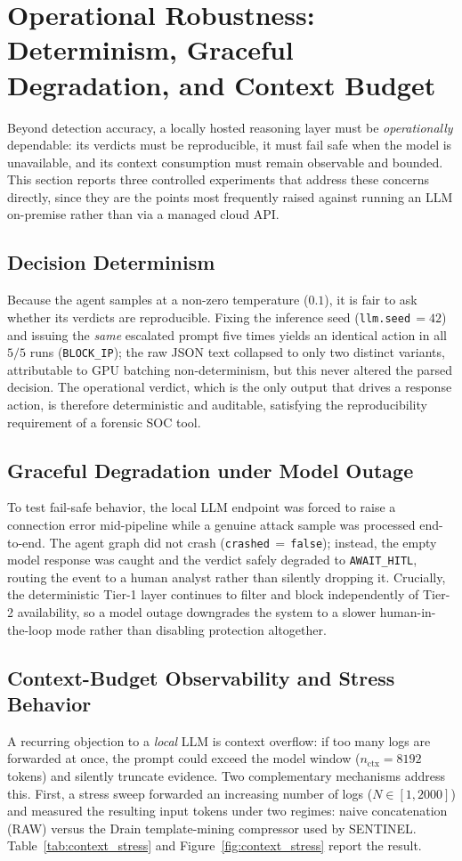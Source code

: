 \section{Operational Robustness: Determinism, Graceful Degradation, and Context Budget}
Beyond detection accuracy, a locally hosted reasoning layer must be \emph{operationally} dependable: its verdicts must be reproducible, it must fail safe when the model is unavailable, and its context consumption must remain observable and bounded. This section reports three controlled experiments that address these concerns directly, since they are the points most frequently raised against running an LLM on-premise rather than via a managed cloud API.

\subsection{Decision Determinism}
Because the agent samples at a non-zero temperature ($0.1$), it is fair to ask whether its verdicts are reproducible. Fixing the inference seed (\texttt{llm.seed}\,$=42$) and issuing the \emph{same} escalated prompt five times yields an identical action in all $5/5$ runs (\texttt{BLOCK\_IP}); the raw JSON text collapsed to only two distinct variants, attributable to GPU batching non-determinism, but this never altered the parsed decision. The operational verdict, which is the only output that drives a response action, is therefore deterministic and auditable, satisfying the reproducibility requirement of a forensic SOC tool.

\subsection{Graceful Degradation under Model Outage}
To test fail-safe behavior, the local LLM endpoint was forced to raise a connection error mid-pipeline while a genuine attack sample was processed end-to-end. The agent graph did not crash (\texttt{crashed}\,$=$\,\texttt{false}); instead, the empty model response was caught and the verdict safely degraded to \texttt{AWAIT\_HITL}, routing the event to a human analyst rather than silently dropping it. Crucially, the deterministic Tier-1 layer continues to filter and block independently of Tier-2 availability, so a model outage downgrades the system to a slower human-in-the-loop mode rather than disabling protection altogether.

\subsection{Context-Budget Observability and Stress Behavior}
A recurring objection to a \emph{local} LLM is context overflow: if too many logs are forwarded at once, the prompt could exceed the model window ($n_{\text{ctx}} = 8192$ tokens) and silently truncate evidence. Two complementary mechanisms address this. First, a stress sweep forwarded an increasing number of logs ($N \in [1, 2000]$) and measured the resulting input tokens under two regimes: naive concatenation (RAW) versus the Drain template-mining compressor used by SENTINEL. Table~\ref{tab:context_stress} and Figure~\ref{fig:context_stress} report the result.

